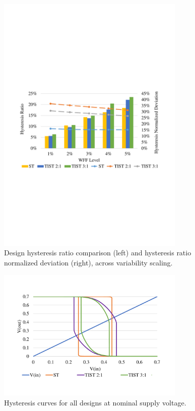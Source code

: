 \documentclass[diss,pgmicro,english]{iiufrgs}
\begin{document}
    \begin{figure}[H]
        \centering
            \includegraphics[width=0.8\textwidth, trim={1.25cm 9cm 2cm 10cm}, clip]{hystWFFComp.pdf}
            \caption{Design hysteresis ratio comparison (left) and hysteresis ratio normalized deviation (right), across variability scaling.}
        \label{figsHystComp}
    \end{figure}

    \begin{figure}[H]
        \centering
            \includegraphics[width=0.8\textwidth, trim={2cm 3cm 2cm 3cm}, clip]{hystGraphs.pdf}
            \caption{Hysteresis curves for all designs at nominal supply voltage.}
        \label{fig:hystCurves}
    \end{figure}
\end{document}

